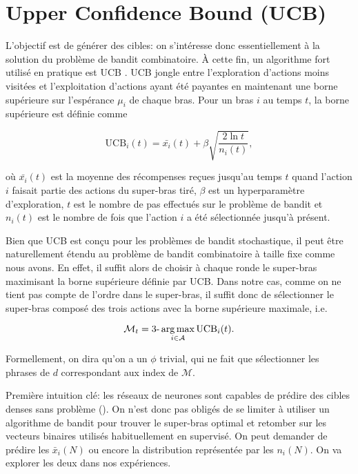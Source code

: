 \section{Upper Confidence Bound (UCB)}

L'objectif est de générer des cibles: on s'intéresse donc essentiellement à la solution
du problème de bandit combinatoire.
À cette fin, un algorithme fort utilisé en pratique est UCB \citep{ucb}.
UCB jongle entre l'exploration d'actions moins visitées et l'exploitation d'actions
ayant été payantes en maintenant une borne supérieure sur l'espérance $\mu_i$ de chaque
bras.
Pour un bras $i$ au temps $t$, la borne supérieure est définie comme

\begin{equation}
    \text{UCB}_i(t) = \bar{x_i}(t) + \beta \sqrt{\frac{2\ln t}{n_i(t)}},
\end{equation}

où $\bar{x_i}(t)$ est la moyenne des récompenses reçues jusqu'au temps $t$ quand l'action $i$ faisait partie des actions
du super-bras tiré, $\beta$ est un hyperparamètre d'exploration, $t$ est le nombre de pas
effectués sur le problème de bandit et $n_i(t)$ est le nombre de fois que l'action $i$ a été
sélectionnée jusqu'à présent.

Bien que UCB est conçu pour les problèmes de bandit stochastique, il peut être naturellement
étendu au problème de bandit combinatoire à taille fixe comme nous avons.
En effet, il suffit alors de choisir à chaque ronde le super-bras maximisant
la borne supérieure définie par UCB.
Dans notre cas, comme on ne tient pas compte de l'ordre dans le super-bras,
il suffit donc de sélectionner le super-bras composé des trois actions avec la borne
supérieure maximale, i.e.

\begin{equation*}
    \mathcal{M}_t = \text{3-}\operatorname*{arg\,max}_{i \in \mathcal{A}} \text{UCB}_i(t).
\end{equation*}

Formellement, on dira qu'on a un $\phi$ trivial, qui ne fait que sélectionner
les phrases de $d$ correspondant aux index de $\mathcal{M}$.

Première intuition clé: les réseaux de neurones sont capables de prédire des cibles denses
sans problème ().
On n'est donc pas obligés de se limiter à utiliser un algorithme de bandit pour trouver
le super-bras optimal et retomber sur les vecteurs binaires utilisés habituellement en
supervisé.
On peut demander de prédire les $\bar{x}_i(N)$ ou encore la distribution représentée
par les $n_i(N)$.
On va explorer les deux dans nos expériences.

